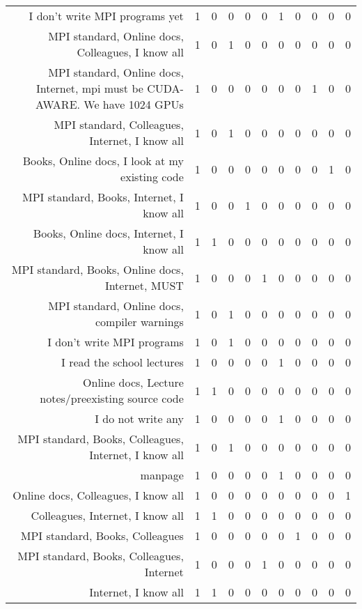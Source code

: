 {\begin{landscape}
\begin{longtable}[htb]{r|c|c|c|c|c|c|c|c|c|c}
{I don't write MPI programs yet} & 1 & 0 & 0 & 0 & 0 & 1 & 0 & 0 & 0 & 0 \\%
{MPI standard, Online docs, Colleagues, I know all} & 1 & 0 & 1 & 0 & 0 & 0 & 0 & 0 & 0 & 0 \\%
{MPI standard, Online docs, Internet, mpi must be CUDA-AWARE. We have 1024 GPUs} & 1 & 0 & 0 & 0 & 0 & 0 & 0 & 1 & 0 & 0 \\%
{MPI standard, Colleagues, Internet, I know all} & 1 & 0 & 1 & 0 & 0 & 0 & 0 & 0 & 0 & 0 \\%
{Books, Online docs, I look at my existing code} & 1 & 0 & 0 & 0 & 0 & 0 & 0 & 0 & 1 & 0 \\%
{MPI standard, Books, Internet, I know all} & 1 & 0 & 0 & 1 & 0 & 0 & 0 & 0 & 0 & 0 \\%
{Books, Online docs, Internet, I know all} & 1 & 1 & 0 & 0 & 0 & 0 & 0 & 0 & 0 & 0 \\%
{MPI standard, Books, Online docs, Internet, MUST} & 1 & 0 & 0 & 0 & 1 & 0 & 0 & 0 & 0 & 0 \\%
{MPI standard, Online docs, compiler warnings} & 1 & 0 & 1 & 0 & 0 & 0 & 0 & 0 & 0 & 0 \\%
{I don't write MPI programs} & 1 & 0 & 1 & 0 & 0 & 0 & 0 & 0 & 0 & 0 \\%
{I read the school lectures} & 1 & 0 & 0 & 0 & 0 & 1 & 0 & 0 & 0 & 0 \\%
{Online docs, Lecture notes/preexisting source code} & 1 & 1 & 0 & 0 & 0 & 0 & 0 & 0 & 0 & 0 \\%
{I do not write any} & 1 & 0 & 0 & 0 & 0 & 1 & 0 & 0 & 0 & 0 \\%
{MPI standard, Books, Colleagues, Internet, I know all} & 1 & 0 & 1 & 0 & 0 & 0 & 0 & 0 & 0 & 0 \\%
{manpage} & 1 & 0 & 0 & 0 & 0 & 1 & 0 & 0 & 0 & 0 \\%
{Online docs, Colleagues, I know all} & 1 & 0 & 0 & 0 & 0 & 0 & 0 & 0 & 0 & 1 \\%
{Colleagues, Internet, I know all} & 1 & 1 & 0 & 0 & 0 & 0 & 0 & 0 & 0 & 0 \\%
{MPI standard, Books, Colleagues} & 1 & 0 & 0 & 0 & 0 & 0 & 1 & 0 & 0 & 0 \\%
{MPI standard, Books, Colleagues, Internet} & 1 & 0 & 0 & 0 & 1 & 0 & 0 & 0 & 0 & 0 \\%
{Internet, I know all} & 1 & 1 & 0 & 0 & 0 & 0 & 0 & 0 & 0 & 0 \\%
\hline%
\end{longtable}%
\end{landscape}}%
\clearpage%
